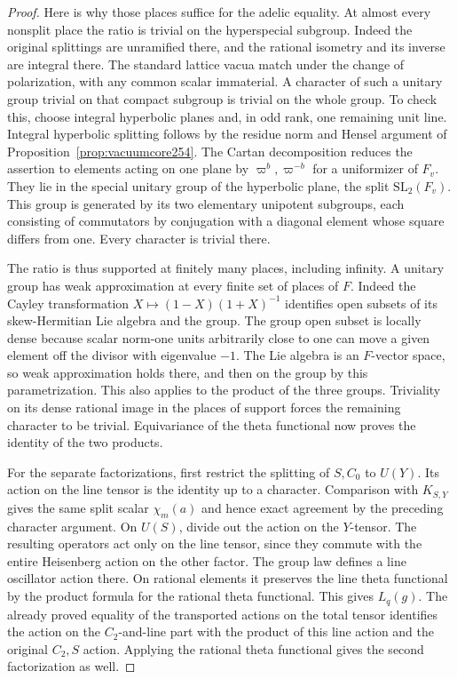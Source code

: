 \documentclass[a4paper,11pt]{article}
\theoremstyle{definition}
\theoremstyle{remark}
\numberwithin{equation}{section}
\begin{document}
\begin{proof}
Here is why those places suffice for the adelic equality. At
almost every nonsplit place the ratio is trivial on the
hyperspecial subgroup. Indeed the original splittings are
unramified there, and the rational isometry and its inverse
are integral there. The standard lattice vacua match under
the change of polarization, with any common scalar immaterial.
A character of such a unitary group trivial on that compact
subgroup is trivial on the whole group. To check this, choose
integral hyperbolic planes and, in odd rank, one remaining
unit line. Integral hyperbolic splitting follows by the
residue norm and Hensel argument of
Proposition~\ref{prop:vacuumcore254}. The Cartan decomposition
reduces the assertion to elements acting on one plane by
\(\varpi^b,\varpi^{-b}\) for a uniformizer of \(F_v\).
They lie in the special unitary group of the hyperbolic plane,
the split \(\mathrm{SL}_2(F_v)\). This group is generated by
its two elementary unipotent subgroups, each consisting of
commutators by conjugation with a diagonal element whose square
differs from one. Every character is trivial there.

The ratio is thus supported at finitely many places, including
infinity. A unitary group has weak approximation at every
finite set of places of \(F\). Indeed the Cayley transformation
\(X\mapsto(1-X)(1+X)^{-1}\) identifies open subsets of its
skew-Hermitian Lie algebra and the group. The group open subset
is locally dense because scalar norm-one units arbitrarily close to one
can move a given element off the divisor with eigenvalue \(-1\).
The Lie algebra is an \(F\)-vector space, so weak approximation
holds there, and then on the group by this parametrization.
This also applies to the product of the three groups. Triviality
on its dense rational image in the places of support forces
the remaining character to be trivial. Equivariance of the
theta functional now proves the identity of the two products.

For the separate factorizations, first restrict the splitting
of \(S,C_0\) to \(U(Y)\). Its action on the line tensor is the
identity up to a character. Comparison with \(K_{S,Y}\) gives
the same split scalar \(\chi_m(a)\) and hence exact agreement
by the preceding character argument. On \(U(S)\), divide out
the action on the \(Y\)-tensor. The resulting operators act
only on the line tensor, since they commute with the entire
Heisenberg action on the other factor. The group law defines
a line oscillator action there. On rational elements it
preserves the line theta functional by the product formula
for the rational theta functional. This gives \(L_q(g)\).
The already proved equality of the transported actions on
the total tensor identifies the action on the \(C_2\)-and-line
part with the product of this line action and the original
\(C_2,S\) action. Applying the rational theta functional gives
the second factorization as well.
\end{proof}
\end{document}
